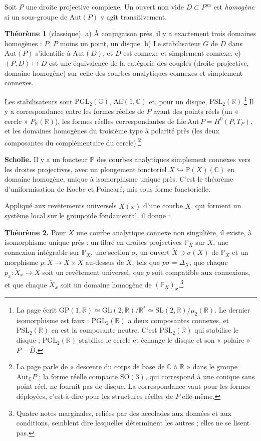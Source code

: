 \documentclass[11pt,a4paper]{article}
\begin{document}
Soit $P$ une droite projective complexe. Un ouvert non vide $D \subset
P^{\mathrm{an}}$ est \emph{homogène} si un sous-groupe de $\mathrm{Aut}(P)$ y agit
transitivement.

\textbf{Théorème 1} (classique). a) À conjugaison près, il y a exactement trois
domaines homogènes : $P$, $P$ moins un point, un disque. b) Le stabilisateur
$G$ de $D$ dans $\mathrm{Aut}(P)$ s'identifie à $\mathrm{Aut}(D)$, et $D$ est connexe
et simplement connexe. c) $(P, D) \mapsto D$ est une équivalence de la
catégorie des couples (droite projective, domaine homogène) sur celle des
courbes analytiques connexes et simplement connexes.

Les stabilisateurs sont $\mathrm{PGL}_2(\mathbb{C})$, $\mathrm{Aff}(1,\mathbb{C})$ et,
pour un disque, $\mathrm{PSL}_2(\mathbb{R})$.\footnote{La page écrit
$\mathrm{GP}(1,\mathbb{R}) \simeq \mathrm{GL}(2,\mathbb{R})/\mathbb{R}^* \simeq
\mathrm{SL}(2,\mathbb{R})/\mu_2(\mathbb{R})$. Le dernier isomorphisme est faux :
$\mathrm{PGL}_2(\mathbb{R})$ a deux composantes connexes, et
$\mathrm{PSL}_2(\mathbb{R})$ en est la composante neutre. C'est
$\mathrm{PSL}_2(\mathbb{R})$ qui stabilise le disque ; $\mathrm{PGL}_2(\mathbb{R})$
stabilise le cercle et échange le disque et son « polaire » $P - \overline{D}$.}
Il y a correspondance entre les formes réelles de $P$ ayant des points
réels (un « cercle » $P_{\mathbb{R}}(\mathbb{R})$), les formes réelles
correspondantes de $\mathrm{Lie}\,\mathrm{Aut}\,P = H^0(P, T_P)$, et les domaines
homogènes du troisième type à polarité près (les deux composantes du
complémentaire du cercle).\footnote{La page parle de « descente du corps de
base de $\mathbb{C}$ à $\mathbb{R}$ » dans le groupe $\mathrm{Aut}_{\mathbb{C}}P$ ; la
forme réelle compacte $\mathrm{SO}(3)$, qui correspond à une conique sans
point réel, ne fournit pas de disque. La correspondance vaut pour les formes
déployées, c'est-à-dire pour les structures réelles de $P$ elle-même.}

\textbf{Scholie.} Il y a un foncteur $\mathbb{P}$ des courbes analytiques
simplement connexes vers les droites projectives, avec un plongement
fonctoriel $X \hookrightarrow \mathbb{P}(X)(\mathbb{C})$ en domaine homogène,
unique à isomorphisme unique près. C'est le théorème d'uniformisation de
Koebe et Poincaré, mis sous forme fonctorielle.

Appliqué aux revêtements universels $\widetilde{X}(x)$ d'une courbe $X$, qui
forment un système local sur le groupoïde fondamental, il donne :

\textbf{Théorème 2.} Pour $X$ une courbe analytique connexe non singulière,
il existe, à isomorphisme unique près : un fibré en droites projectives
$\mathbb{P}_X$ sur $X$, une connexion intégrable sur $\mathbb{P}_X$, une section
$\sigma$, un ouvert $\widetilde{X} \supset \sigma(X)$ de $\mathbb{P}_X$ et un
morphisme $p : \widetilde{X} \to X \times X$ au-dessus de $X$, tels que
$p\sigma = \Delta_X$, que chaque $p_x : \widetilde{X}_x \to X$ soit un revêtement
universel, que $p$ soit compatible aux connexions, et que chaque
$\widetilde{X}_x$ soit un domaine homogène de $(\mathbb{P}_X)_x$.\footnote{Quatre
notes marginales, reliées par des accolades aux données et aux conditions,
semblent dire lesquelles déterminent les autres ; elles ne se lisent pas.}
\end{document}
